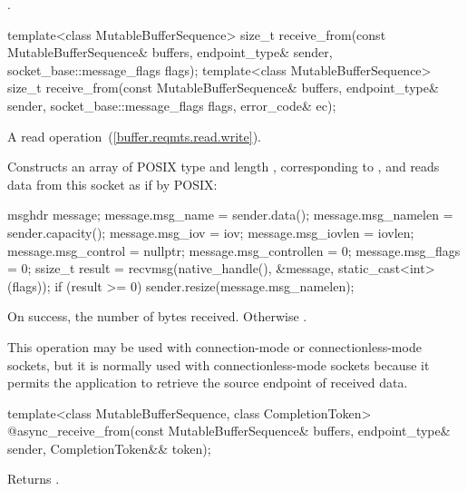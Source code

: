 \begin{itemdescr}
\pnum
\returns {}.
\end{itemdescr}

\begin{itemdecl}
template<class MutableBufferSequence>
  size_t receive_from(const MutableBufferSequence& buffers,
                      endpoint_type& sender,
                      socket_base::message_flags flags);
template<class MutableBufferSequence>
  size_t receive_from(const MutableBufferSequence& buffers,
                      endpoint_type& sender,
                      socket_base::message_flags flags,
                      error_code& ec);
\end{itemdecl}

\begin{itemdescr}
\pnum
A read operation~(\ref{buffer.reqmts.read.write}).

\pnum
\effects Constructs an array  of POSIX type  and length , corresponding to , and reads data from this socket as if by POSIX: 
\begin{codeblock}
msghdr message;
message.msg_name = sender.data();
message.msg_namelen = sender.capacity();
message.msg_iov = iov;
message.msg_iovlen = iovlen;
message.msg_control = nullptr;
message.msg_controllen = 0;
message.msg_flags = 0;
ssize_t result = recvmsg(native_handle(), &message, static_cast<int>(flags));
if (result >= 0)
  sender.resize(message.msg_namelen);
\end{codeblock}


\pnum
\returns On success, the number of bytes received. Otherwise .

\pnum
 \enternote This operation may be used with connection-mode or connectionless-mode sockets, but it is normally used with connectionless-mode sockets because it permits the application to retrieve the source endpoint of received data. \exitnote
\end{itemdescr}

\begin{itemdecl}
template<class MutableBufferSequence, class CompletionToken>
  @\DEDUCED@ async_receive_from(const MutableBufferSequence& buffers,
                             endpoint_type& sender,
                             CompletionToken&& token);
\end{itemdecl}

\begin{itemdescr}
\pnum
\effects Returns .
\end{itemdescr}


